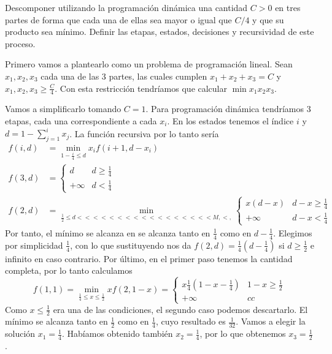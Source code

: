 \documentclass[twoside]{article}
\begin{document}
\newpage 
\begin{ejercicio}{6}\label{6}
Descomponer utilizando la programación dinámica una cantidad $C > 0$ en tres partes de forma
que cada una de ellas sea mayor o igual que $C/4$ y que su producto sea mínimo. Definir las etapas,
estados, decisiones y recursividad de este proceso.
\end{ejercicio}
\begin{solucion}
Primero vamos a plantearlo como un problema de programación lineal. Sean $x_1,x_2,x_3$ cada una de las 3 partes, las cuales cumplen $x_1+x_2+x_3=C$ y $x_1,x_2,x_3\geq\frac{C}{4}$. Con esta restricción tendríamos que calcular $\min x_1x_2x_3$. 

Vamos a simplificarlo tomando $C=1$. Para programación dinámica tendríamos 3 etapas, cada una correspondiente a cada $x_i$. En los estados tenemos el índice $i$ y $d=1-\sum_{j=1}^ix_j$. La función recursiva por lo tanto sería
\begin{align*}
f(i,d)&=\min_{1-\frac{i}{4}\leq d} x_if(i+1,d-x_i) \\
f(3,d)&=\begin{cases}
d & d\geq\frac{1}{4}\\
+\infty & d<\frac{1}{4}
\end{cases}\\
f(2,d)&=\min_{\frac{1}{2}\leq d<< <<<<<<<<<<<<<<   <M, <,}\begin{cases}
x(d-x) & d-x\geq\frac{1}{4}\\
+\infty & d-x <\frac{1}{4}
\end{cases}
\end{align*}
Por tanto, el mínimo se alcanza en  se alcanza tanto en $\frac{1}{4}$ como en $d-\frac{1}{4}$. Elegimos por simplicidad $\frac{1}{4}$, con lo que sustituyendo nos da $f(2,d)=\frac{1}{4}(d-\frac{1}{4})$ si $d\geq\frac{1}{2}$ e infinito en caso contrario. Por último, en el primer paso tenemos la cantidad completa, por lo tanto calculamos
$$f(1,1)=\min_{\frac{1}{4}\leq x\leq\frac{1}{2}}xf(2,1-x)=\begin{cases}
x\frac{1}{4}(1-x-\frac{1}{4}) & 1-x\geq\frac{1}{2}\\
+\infty & cc
\end{cases}$$
Como $x\leq\frac{1}{2}$ era una de las condiciones, el segundo caso podemos descartarlo. El mínimo se alcanza tanto en $\frac{1}{2}$ como en $\frac{1}{4}$, cuyo resultado es $\frac{1}{32}$. Vamos a elegir la solución $x_1=\frac{1}{4}$. Habíamos obtenido también $x_2=\frac{1}{4}$, por lo que obtenemos $x_3=\frac{1}{2}$.
\end{solucion}
\end{document}
